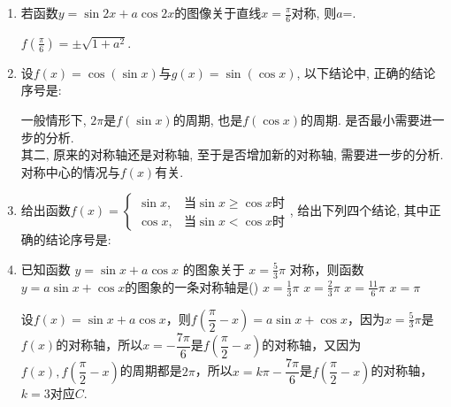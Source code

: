 \begin{enumerate}
\item 若函数$y=\sin2x+a\cos2x$的图像关于直线$x=\frac{\pi}{6}$对称, 则$a$=. 
\begin{jieda}
$f(\frac{\pi}{6})=\pm\sqrt{1+a^2}$. 
\end{jieda}

\item 设$f(x)=\cos(\sin x)$与$g(x)=\sin(\cos x)$, 以下结论中, 正确的结论序号是: 
\begin{jieda}
一般情形下, $2\pi$是$f(\sin{x})$的周期, 也是$f(\cos{x})$的周期. 是否最小需要进一步的分析. \\
其二, 原来的对称轴还是对称轴, 至于是否增加新的对称轴, 需要进一步的分析. 对称中心的情况与$f(x)$有关. 
\end{jieda}


\item 给出函数$f(x)=\begin{cases}
\sin{x}, & \text{当}\sin{x}\geq\cos{x}\text{时}\\
\cos{x}, & \text{当}\sin{x}<\cos{x}\text{时}
\end{cases}$, 给出下列四个结论, 其中正确的结论序号是: 


\item 已知函数 $y=\sin x+a \cos x$ 的图象关于 $x=\frac{5}{3} \pi$ 对称，则函数 $y=a \sin x+\cos x$的图象的一条对称轴是\dotfill()
\xx
{$x=\frac{1}{3} \pi$}
{$x=\frac{2}{3} \pi$}
{$x=\frac{11}{6} \pi$}
{$x=\pi$}
\begin{jieda}
    设$f(x) = \sin x+a \cos x$，则$f\left(\dfrac{\pi}{2} - x\right) = a \sin x+\cos x$，因为$x=\frac{5}{3} \pi$是$f(x)$的对称轴，所以$x = -\dfrac{7\pi}{6}$是$f\left(\dfrac{\pi}{2} - x\right)$的对称轴，又因为$f(x), f\left(\dfrac{\pi}{2} - x\right) $的周期都是$2\pi$，所以$x = k\pi - \dfrac{7\pi}{6}$是$f\left(\dfrac{\pi}{2} - x\right) $的对称轴，$k = 3$对应$C.$
\end{jieda}


\end{enumerate}
